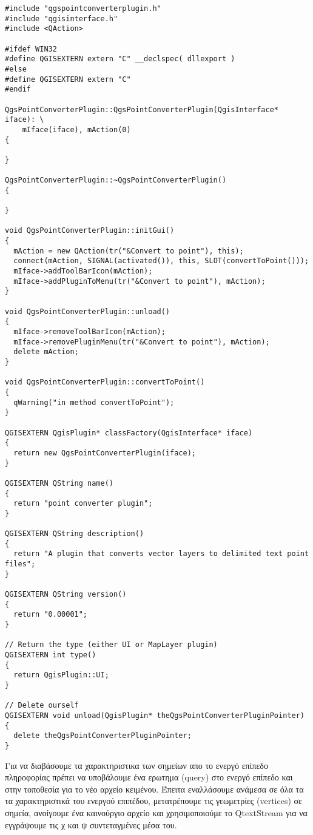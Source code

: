 \begin{verbatim}
#include "qgspointconverterplugin.h"
#include "qgisinterface.h"
#include <QAction>

#ifdef WIN32
#define QGISEXTERN extern "C" __declspec( dllexport )
#else
#define QGISEXTERN extern "C"
#endif

QgsPointConverterPlugin::QgsPointConverterPlugin(QgisInterface* iface): \
    mIface(iface), mAction(0)
{

}

QgsPointConverterPlugin::~QgsPointConverterPlugin()
{

}

void QgsPointConverterPlugin::initGui()
{
  mAction = new QAction(tr("&Convert to point"), this);
  connect(mAction, SIGNAL(activated()), this, SLOT(convertToPoint()));
  mIface->addToolBarIcon(mAction);
  mIface->addPluginToMenu(tr("&Convert to point"), mAction);
}

void QgsPointConverterPlugin::unload()
{
  mIface->removeToolBarIcon(mAction);
  mIface->removePluginMenu(tr("&Convert to point"), mAction);
  delete mAction;
}

void QgsPointConverterPlugin::convertToPoint()
{
  qWarning("in method convertToPoint");
}

QGISEXTERN QgisPlugin* classFactory(QgisInterface* iface)
{
  return new QgsPointConverterPlugin(iface);
}

QGISEXTERN QString name()
{
  return "point converter plugin";
}

QGISEXTERN QString description()
{
  return "A plugin that converts vector layers to delimited text point files";
}

QGISEXTERN QString version()
{
  return "0.00001";
}

// Return the type (either UI or MapLayer plugin)
QGISEXTERN int type()
{
  return QgisPlugin::UI;
}

// Delete ourself
QGISEXTERN void unload(QgisPlugin* theQgsPointConverterPluginPointer)
{
  delete theQgsPointConverterPluginPointer;
}
\end{verbatim}



Για να διαβάσουμε τα χαρακτηριστικα των σημείων απο το ενεργό επίπεδο πληροφορίας πρέπει να υποβάλουμε ένα ερωτημα (query) στο ενεργό επίπεδο και στην τοποθεσία για το νέο αρχείο κειμένου. Έπειτα εναλλάσουμε ανάμεσα σε όλα τα τα χαρακτηριστικά του ενεργού επιπέδου, μετατρέπουμε τις γεωμετρίες (vertices) σε σημεία, ανοίγουμε ένα καινούργιο αρχείο και χρησιμοποιούμε το QtextStream για να εγγράψουμε τις χ και ψ συντεταγμένες μέσα του.

